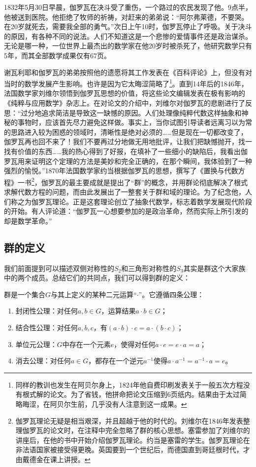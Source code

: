 \documentclass[b5paper]{ctexart}
\begin{document}
1832年5月30日早晨，伽罗瓦在决斗受了重伤，一个路过的农民发现了他。9点半，他被送到医院。他拒绝了牧师的祈祷，对赶来的弟弟说：“阿尔弗莱德，不要哭。在20岁就死去，需要我全部的勇气。”次日上午10时，伽罗瓦停止了呼吸。关于决斗的原因，有各种不同的说法。人们不知道这是一个悲惨的爱情事件还是政治谋杀。无论是哪一种，一位世界上最杰出的数学家在他20岁时被杀死了，他研究数学只有5年，而其全部数学成果仅有67页。

谢瓦利耶和伽罗瓦的弟弟按照他的遗愿将其工作发表在《百科评论》上，但没有对当时的数学发展产生影响。也许是因为它太晦涩简略了\footnote{同样的教训也发生在阿贝尔身上，1824年他自费印刷发表关于一般五次方程没有根式解的论文。为了省钱，他拼命把论文压缩到6页纸内。结果由于太过简略晦涩，在阿贝尔生前，几乎没有人注意到这一成果。}。直到14年后的1846年，法国数学家刘维尔领悟到伽罗瓦思想的价值，将这些论文编辑发表在极有影响的《纯粹与应用数学》杂志上。在对论文的介绍中，刘维尔对伽罗瓦的悲剧进行了反思：“过分地追求简洁是导致这一缺憾的原因。人们处理像纯粹代数这样抽象和神秘的事物时，应该首先尽力避免这样做。事实上，当你试图引导读者远离习以为常的思路进入较为困惑的领域时，清晰性是绝对必须的……但是现在一切都改变了，伽罗瓦再也回不来了！我们不要再过分地做无用地批评，让我们把缺憾抛开，找一找有价值的东西……我的热心得到了好报，在填补了一些细小的缺陷后，我看出伽罗瓦用来证明这个定理的方法是美妙和完全正确的，在那个瞬间，我体验到了一种强烈的愉悦。”1870年法国数学家约当根据伽罗瓦的思想，撰写了《置换与代数方程》一书\footnote{伽罗瓦理论无疑是相当艰深，并且超越于他的时代的。刘维尔在1846年发表整理伽罗瓦的论文时，在注释中完全忽略了群的核心思想。塞雷参加了刘维尔的讲座后，在他的书中开始介绍伽罗瓦理论。约当是塞雷的学生。伽罗瓦理论在非法语国家被接受得更晚。英国要到一个世纪后，而德国直到哥廷根时代，才由戴德金在课上讲授。}，伽罗瓦的最主要成就是提出了“群”的概念，并用群论彻底解决了根式求解代数方程的问题，而由此发展出了一整套关于群和域的理论。为了纪念他，人们称之为伽罗瓦理论。正是这套理论创立了抽象代数学，标志着数学发展现代阶段的开始。有人评论道：“伽罗瓦一心想要参加的是政治革命，然而实际上所引发的却是数学革命。\cite{StepanovRose15}”

\subsection{群的定义}

我们前面提到可以描述双侧对称性的$S_2$和三角形对称性的$S_3$其实是群这个大家族中的两个成员。总结它们的共同点，我们可以得到群的定义：

\begin{definition}群是一个集合$G$与其上定义的某种二元运算“$\cdot$”。它遵循四条公理：
\begin{enumerate}
\item 封闭性公理：对任何$a, b \in G$，运算结果$a \cdot b \in G$；
\item 结合性公理：对任何$a, b, c$，有$(a \cdot b) \cdot c = a \cdot (b \cdot c)$；
\item 单位元公理：$G$中存在一个元素$e$，使得对任何$a \cdot e = e \cdot a = a$；
\item 消去公理：对任何$a \in G$，都存在一个逆元$a^{-1}$使得$a \cdot a^{-1} = a^{-1} \cdot a = e$。
\end{enumerate}
\end{definition}
\end{document}
